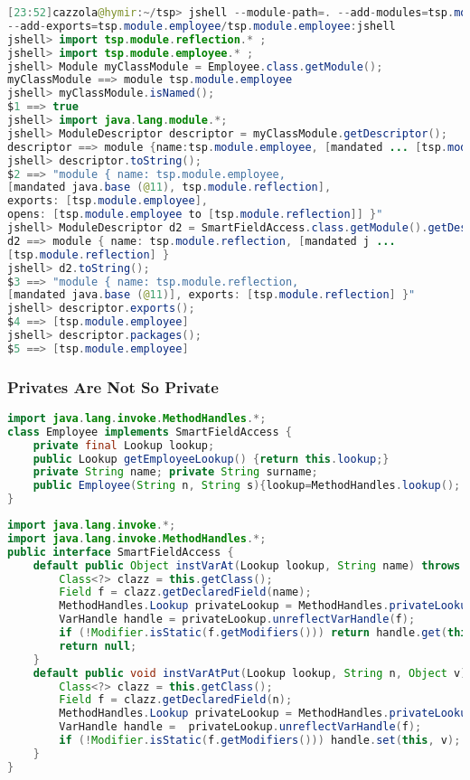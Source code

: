 \begin{lstlisting}[language=Java]
[23:52]cazzola@hymir:~/tsp> jshell --module-path=. --add-modules=tsp.module.employee
--add-exports=tsp.module.employee/tsp.module.employee:jshell
jshell> import tsp.module.reflection.* ;
jshell> import tsp.module.employee.* ;
jshell> Module myClassModule = Employee.class.getModule();
myClassModule ==> module tsp.module.employee
jshell> myClassModule.isNamed();
$1 ==> true
jshell> import java.lang.module.*;
jshell> ModuleDescriptor descriptor = myClassModule.getDescriptor();
descriptor ==> module {name:tsp.module.employee, [mandated ... [tsp.module.reflection]]}
jshell> descriptor.toString();
$2 ==> "module { name: tsp.module.employee,
[mandated java.base (@11), tsp.module.reflection],
exports: [tsp.module.employee],
opens: [tsp.module.employee to [tsp.module.reflection]] }"
jshell> ModuleDescriptor d2 = SmartFieldAccess.class.getModule().getDescriptor() ;
d2 ==> module { name: tsp.module.reflection, [mandated j ...
[tsp.module.reflection] }
jshell> d2.toString();
$3 ==> "module { name: tsp.module.reflection,
[mandated java.base (@11)], exports: [tsp.module.reflection] }"
jshell> descriptor.exports();
$4 ==> [tsp.module.employee]
jshell> descriptor.packages();
$5 ==> [tsp.module.employee]
\end{lstlisting}

\subsubsection{Privates Are Not So Private}

\begin{lstlisting}[language=Java]
import java.lang.invoke.MethodHandles.*;
class Employee implements SmartFieldAccess {
	private final Lookup lookup;
	public Lookup getEmployeeLookup() {return this.lookup;}
	private String name; private String surname;
	public Employee(String n, String s){lookup=MethodHandles.lookup(); name=n; 			surname=s;}
}
\end{lstlisting}

\begin{lstlisting}[language=Java]
import java.lang.invoke.*;
import java.lang.invoke.MethodHandles.*;
public interface SmartFieldAccess {
	default public Object instVarAt(Lookup lookup, String name) throws Exception {
		Class<?> clazz = this.getClass();
		Field f = clazz.getDeclaredField(name);
		MethodHandles.Lookup privateLookup = MethodHandles.privateLookupIn(clazz, lookup);
		VarHandle handle = privateLookup.unreflectVarHandle(f);
		if (!Modifier.isStatic(f.getModifiers())) return handle.get(this);
		return null;
	}
	default public void instVarAtPut(Lookup lookup, String n, Object v) throws Exception{
		Class<?> clazz = this.getClass();
		Field f = clazz.getDeclaredField(n);
		MethodHandles.Lookup privateLookup = MethodHandles.privateLookupIn(clazz, lookup);
		VarHandle handle =  privateLookup.unreflectVarHandle(f);
		if (!Modifier.isStatic(f.getModifiers())) handle.set(this, v);
	}
}
\end{lstlisting}


